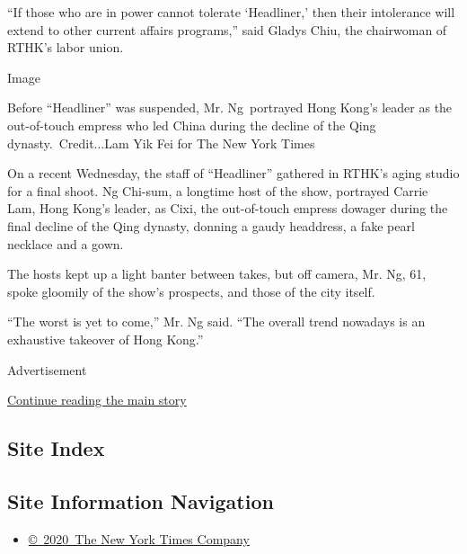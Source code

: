 ``If those who are in power cannot tolerate `Headliner,' then their
intolerance will extend to other current affairs programs,'' said Gladys
Chiu, the chairwoman of RTHK's labor union.

Image

Before ``Headliner'' was suspended, Mr. Ng~portrayed Hong Kong's leader
as the out-of-touch empress who led China during the decline of the Qing
dynasty.~Credit...Lam Yik Fei for The New York Times

On a recent Wednesday, the staff of ``Headliner'' gathered in RTHK's
aging studio for a final shoot. Ng Chi-sum, a longtime host of the show,
portrayed Carrie Lam, Hong Kong's leader, as Cixi, the out-of-touch
empress dowager during the final decline of the Qing dynasty, donning a
gaudy headdress, a fake pearl necklace and a gown.

The hosts kept up a light banter between takes, but off camera, Mr. Ng,
61, spoke gloomily of the show's prospects, and those of the city
itself.

``The worst is yet to come,'' Mr. Ng said. ``The overall trend nowadays
is an exhaustive takeover of Hong Kong.''

Advertisement

\protect\hyperlink{after-bottom}{Continue reading the main story}

\hypertarget{site-index}{%
\subsection{Site Index}\label{site-index}}

\hypertarget{site-information-navigation}{%
\subsection{Site Information
Navigation}\label{site-information-navigation}}

\begin{itemize}
\tightlist
\item
  \href{https://help.nytimes.com/hc/en-us/articles/115014792127-Copyright-notice}{©~2020~The
  New York Times Company}
\end{itemize}

